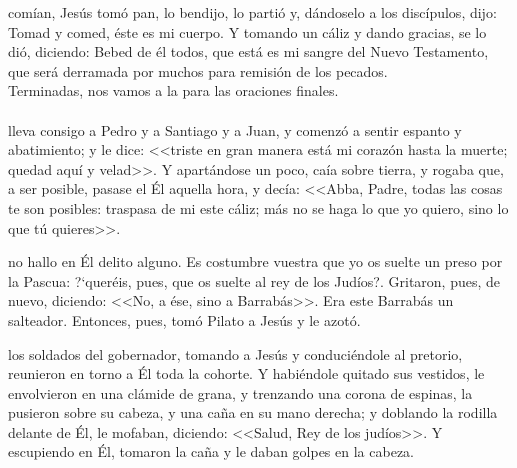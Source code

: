 \documentclass[10pt,twoside]{book}
\begin{document}
\noindent{}
\vspace{2mm}
comían, Jesús tomó pan, lo bendijo, lo partió y, dándoselo a los discípulos, dijo: Tomad y comed, éste es mi cuerpo. 
Y tomando un cáliz y dando gracias, se lo dió, diciendo: Bebed de él todos, que está es mi sangre del Nuevo Testamento, que será derramada por muchos 
para remisión de los pecados.\\[2mm]
{} Terminadas, nos vamos a la  para las oraciones finales.\\[5mm]

\noindent{}\\[4mm]
\vspace{2mm}
\space lleva consigo a Pedro y a Santiago y a Juan, y comenzó a sentir espanto y abatimiento; y le dice: <<triste en gran manera está mi corazón hasta la muerte;
quedad aquí y velad>>. Y apartándose un poco, caía sobre tierra, y rogaba que, a ser posible, pasase el Él aquella hora, y decía: <<Abba, Padre, todas las cosas te son posibles:
traspasa de mi este cáliz; más no se haga lo que yo quiero, sino lo que tú quieres>>.\\[-2mm]

\vspace{5mm}

\noindent{}
\vspace{2mm}
no hallo en Él delito alguno. Es costumbre vuestra que yo os suelte un preso por la Pascua: {?`}queréis, 
pues, que os suelte al rey de los Judíos?\guillemotright. Gritaron, pues, de nuevo, diciendo: <<No, a ése, sino a Barrabás>>. 
Era este Barrabás un salteador. Entonces, pues, tomó Pilato a Jesús y le azotó.\\[2mm]

\vspace{5mm}

\noindent{}
\vspace{2mm}
los soldados del gobernador, tomando a Jesús y conduciéndole al pretorio, reunieron en torno a Él toda la cohorte. 
Y habiéndole quitado sus vestidos, le envolvieron en una clámide de grana, y trenzando una corona de espinas, la pusieron sobre su cabeza, 
y una caña en su mano derecha; y doblando la rodilla delante de Él, le mofaban, diciendo: <<Salud, Rey de los judíos>>. Y escupiendo en Él, 
tomaron la caña y le daban golpes en la cabeza.\\[2mm]

\vspace{5mm}
\end{document}
